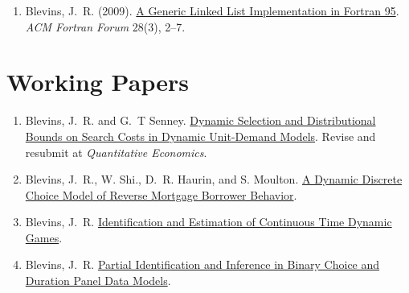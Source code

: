 \documentclass[10pt,letterpaper]{article}
\begin{document}
\begin{enumerate}[resume]
\item Blevins, J.~R. (2009). 
	\href{http://jblevins.org/research/generic-list}{A Generic Linked List Implementation in Fortran 95}.  \textit{ACM Fortran Forum} 28(3), 2--7.
\end{enumerate}

\section*{Working Papers}

\begin{enumerate}[resume]
\item Blevins, J.~R. and G.~T Senney.
  \href{http://jblevins.org/research/dcs}{Dynamic Selection and Distributional Bounds on Search Costs in Dynamic Unit-Demand Models}.
  Revise and resubmit at \textit{Quantitative Economics}.
\item Blevins, J.~R., W. Shi., D.~R. Haurin, and S. Moulton.
  \href{http://jblevins.org/research/ddc-hecm}{A Dynamic Discrete Choice Model of Reverse Mortgage Borrower Behavior}.
\item Blevins, J.~R.
  \href{http://jblevins.org/research/ctgames}{Identification and Estimation of Continuous Time Dynamic Games}.
\item Blevins, J.~R.
  \href{http://jblevins.org/research/panel}{Partial Identification and Inference in Binary Choice and Duration Panel Data Models}.
\end{enumerate}



%
\end{document}
